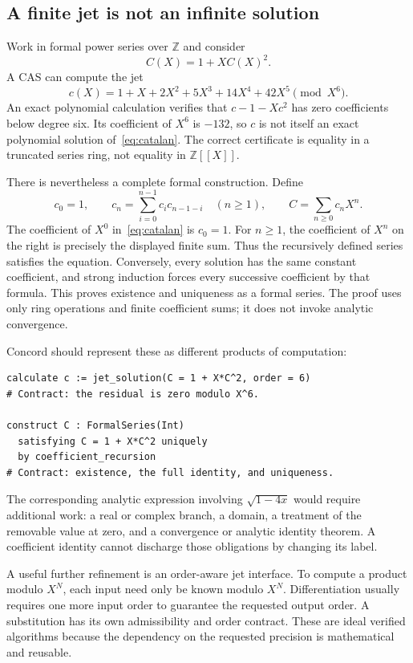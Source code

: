 \documentclass[11pt,a4paper]{article}
\newcommand{\Z}{\mathbb Z}
\theoremstyle{remark}
\begin{document}
\subsection{A finite jet is not an infinite solution}
Work in formal power series over $\Z$ and consider
\begin{equation}
 C(X)=1+XC(X)^2.\label{eq:catalan}
\end{equation}
A CAS can compute the jet
\[
 c(X)=1+X+2X^2+5X^3+14X^4+42X^5\pmod{X^6}.
\]
An exact polynomial calculation verifies that
$c-1-Xc^2$ has zero coefficients below degree six. Its coefficient of $X^6$
is $-132$, so $c$ is not itself an exact polynomial solution of~\eqref{eq:catalan}.
The correct certificate is equality in a truncated series ring, not equality in
$\Z[[X]]$.

There is nevertheless a complete formal construction. Define
\[
 c_0=1,\qquad
 c_n=\sum_{i=0}^{n-1}c_i c_{n-1-i}\quad(n\ge1),
 \qquad C=\sum_{n\ge0}c_nX^n.
\]
The coefficient of $X^0$ in~\eqref{eq:catalan} is $c_0=1$. For $n\ge1$, the
coefficient of $X^n$ on the right is precisely the displayed finite sum. Thus
the recursively defined series satisfies the equation. Conversely, every
solution has the same constant coefficient, and strong induction forces every
successive coefficient by that formula. This proves existence and uniqueness
as a formal series. The proof uses only ring operations and finite coefficient
sums; it does not invoke analytic convergence.

Concord should represent these as different products of computation:
\par\smallskip\noindent\begin{minipage}{\linewidth}
\begin{lstlisting}
calculate c := jet_solution(C = 1 + X*C^2, order = 6)
# Contract: the residual is zero modulo X^6.

construct C : FormalSeries(Int)
  satisfying C = 1 + X*C^2 uniquely
  by coefficient_recursion
# Contract: existence, the full identity, and uniqueness.
\end{lstlisting}
\end{minipage}\par\smallskip
The corresponding analytic expression involving $\sqrt{1-4x}$ would require
additional work: a real or complex branch, a domain, a treatment of the removable
value at zero, and a convergence or analytic identity theorem. A coefficient
identity cannot discharge those obligations by changing its label.

A useful further refinement is an order-aware jet interface. To compute a product
modulo $X^N$, each input need only be known modulo $X^N$. Differentiation usually
requires one more input order to guarantee the requested output order. A
substitution has its own admissibility and order contract. These are ideal
verified algorithms because the dependency on the requested precision is
mathematical and reusable.
\end{document}
